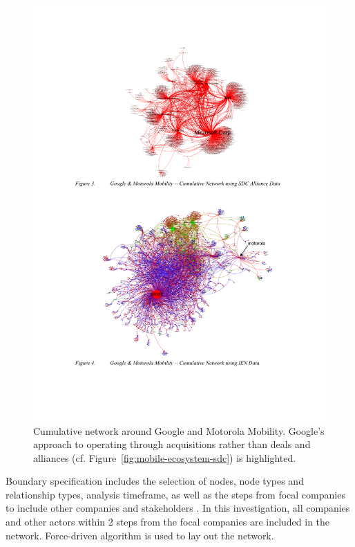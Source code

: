 \begin{figure}[htb]
\centering
\includegraphics[]{figure/Mobile-Ecosystem-Google-Motorola-IEND.pdf}
\caption{Cumulative network around Google and Motorola Mobility. Google's approach to operating through acquisitions rather than deals and alliances (cf. Figure~\ref{fig:mobile-ecosystem-sdc}) is highlighted. \citep{Basole2012UnderstandingApproach}}
\label{fig:mobile-ecosystem-iend}
\end{figure}

Boundary specification includes the selection of nodes, node types and relationship types, analysis timeframe, as well as the steps from focal companies to include other companies and stakeholders \citep{Basole2012UnderstandingApproach}. In this investigation, all companies and other actors within 2 steps from the focal companies are included in the network. Force-driven algorithm is used to lay out the network.

